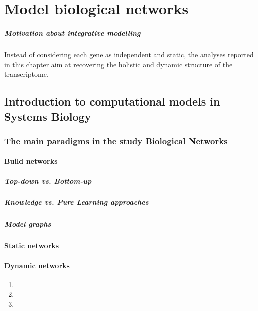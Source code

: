 \chapter{Model biological networks}

\paragraph{Motivation about integrative modelling}
Instead of considering each gene as independent and static, the analyses reported in this chapter aim at recovering the holistic and dynamic structure of the transcriptome.

\section{Introduction to computational models in Systems Biology}

\subsection{The main paradigms in the study Biological Networks}

\subsubsection{Build networks}
\paragraph{Top-down vs. Bottom-up}
\paragraph{Knowledge vs. Pure Learning approaches}
\paragraph{Model graphs}

\subsubsection{Static networks}

\subsubsection{Dynamic networks}

\begin{enumerate}[label=\alph*)]
\item[Boolean networks:]
\item[Random networks:]
\item[Mechanistic networks:]

\end{enumerate}



